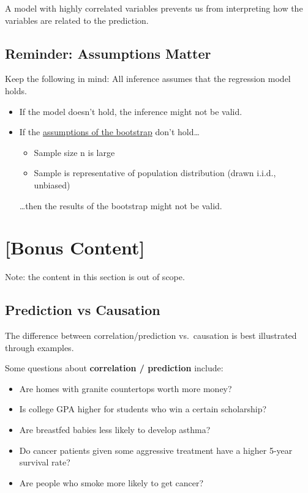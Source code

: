 \documentclass[
  letterpaper,
  DIV=11,
  numbers=noendperiod]{scrreprt}
\providecommand{\tightlist}{%
  \setlength{\itemsep}{0pt}\setlength{\parskip}{0pt}}\usepackage{longtable,booktabs,array}
\begin{document}
A model with highly correlated variables prevents us from interpreting
how the variables are related to the prediction.

\subsection{Reminder: Assumptions
Matter}\label{reminder-assumptions-matter}

Keep the following in mind: All inference assumes that the regression
model holds.

\begin{itemize}
\tightlist
\item
  If the model doesn't hold, the inference might not be valid.
\item
  If the
  \href{https://inferentialthinking.com/chapters/13/3/Confidence_Intervals.html?highlight=p\%20value\%20confidence\%20interval\#care-in-using-the-bootstrap-percentile-method}{assumptions
  of the bootstrap} don't hold\ldots{}

  \begin{itemize}
  \tightlist
  \item
    Sample size n is large
  \item
    Sample is representative of population distribution (drawn i.i.d.,
    unbiased)
  \end{itemize}

  \ldots then the results of the bootstrap might not be valid.
\end{itemize}

\section{{[}Bonus Content{]}}\label{bonus-content}

Note: the content in this section is out of scope.

\subsection{Prediction vs Causation}\label{prediction-vs-causation}

The difference between correlation/prediction vs.~causation is best
illustrated through examples.

Some questions about \textbf{correlation / prediction} include:

\begin{itemize}
\tightlist
\item
  Are homes with granite countertops worth more money?
\item
  Is college GPA higher for students who win a certain scholarship?
\item
  Are breastfed babies less likely to develop asthma?
\item
  Do cancer patients given some aggressive treatment have a higher
  5-year survival rate?
\item
  Are people who smoke more likely to get cancer?
\end{itemize}
\end{document}

